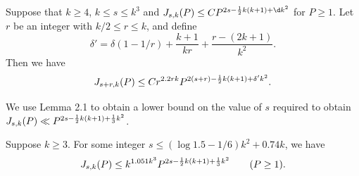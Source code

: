 






%
%
%
%
%
%
%
%
%
  Suppose that $k\ge 4$, $k \le s \le k^3$ and
$J_{s,k}(P)\le C P^{2s-\kk+\d k^2}$ for $P\ge 1$.  Let $r$ be an
integer with $k/2 \le r \le k$, and define
$$
\delta' = \delta (1-1/r) + \frac{k+1}{kr} + \frac{r - (2k+1)}{k^2}.
$$
Then we have
$$
J_{s+r,k}(P) \le C r^{2.2rk} P^{2(s+r)-\frac12 k(k+1) + \delta' k^2}.
$$
\endproclaim

We use Lemma 2.1 to obtain a lower bound on the value of $s$ required to
obtain $J_{s,k}(P) \ll P^{2s-\frac12 k(k+1)+\frac13 k^2}$.

  Suppose $k\ge 3$.  For some integer 
$s \le (\log 1.5 - 1/6)k^2 + 0.74k$, we have
$$
J_{s,k}(P) \le k^{1.051 k^3} P^{2s - \frac12 k(k+1) + \frac13 k^2}
\qquad (P\ge 1).
$$
\endproclaim

